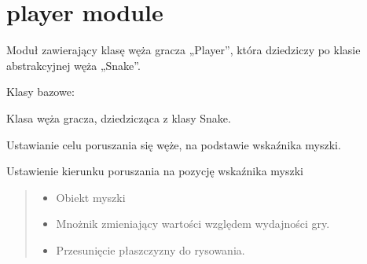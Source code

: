 \documentclass[letterpaper,10pt,polish]{sphinxmanual}
\begin{document}
\sphinxstepscope


\section{player module}
\label{\detokenize{player:module-player}}\label{\detokenize{player:player-module}}\label{\detokenize{player::doc}}
\sphinxAtStartPar
Moduł zawierający klasę węża gracza „Player”, która dziedziczy po klasie
abstrakcyjnej węża „Snake”.

\begin{fulllineitems}
\label{\detokenize{player:player.Player}}
\pysigstartsignatures
{}
\pysigstopsignatures
\sphinxAtStartPar
Klasy bazowe: {\hyperref[\detokenize{snake:snake.Snake}]{}}

\sphinxAtStartPar
Klasa węża gracza, dziedzicząca z klasy Snake.

\sphinxAtStartPar
Ustawianie celu poruszania się węże, na podstawie wskaźnika myszki.

\begin{fulllineitems}
\label{\detokenize{player:player.Player.update}}
\pysigstartsignatures
{}
\pysigstopsignatures
\sphinxAtStartPar
Ustawienie kierunku poruszania na pozycję wskaźnika myszki
\begin{quote}\begin{description}
\begin{itemize}
\item {} 
\sphinxAtStartPar
{} \textendash{} Obiekt myszki

\item {} 
\sphinxAtStartPar
{} \textendash{} Mnożnik zmieniający wartości względem wydajności gry.

\item {} 
\sphinxAtStartPar
{} \textendash{} Przesunięcie płaszczyzny do rysowania.

\end{itemize}

\end{description}\end{quote}

\end{fulllineitems}


\end{fulllineitems}
\end{document}
